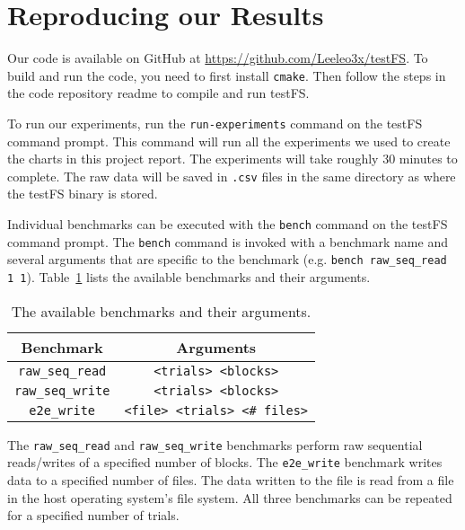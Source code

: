 \section{Reproducing our Results}
Our code is available on GitHub at \url{https://github.com/Leeleo3x/testFS}.
To build and run the code, you need to first install {\tt cmake}. Then
follow the steps in the code repository readme to compile and run testFS.

To run our experiments, run the {\tt run-experiments} command on the testFS
command prompt. This command will run all the experiments we used to create the
charts in this project report. The experiments will take roughly 30 minutes to
complete. The raw data will be saved in {\tt .csv} files in the same directory
as where the testFS binary is stored.

Individual benchmarks can be executed with the {\tt bench} command on the
testFS command prompt. The {\tt bench} command is invoked with a benchmark name
and several arguments that are specific to the benchmark (e.g. {\tt bench
  raw\_seq\_read 1 1}). Table~\ref{tbl:bench-commands} lists the available
benchmarks and their arguments.

\begin{table}[h!]
  \centering
  \caption{The available benchmarks and their arguments.}
  \label{tbl:bench-commands}
  \begin{tabular}{c|c}
    {\bf Benchmark} & {\bf Arguments} \\ \hline
    {\tt raw\_seq\_read} & {\tt <trials> <blocks>} \\ \hline
    {\tt raw\_seq\_write} & {\tt <trials> <blocks>} \\ \hline
    {\tt e2e\_write} & {\tt <file> <trials> <\# files>}
  \end{tabular}
\end{table}

The {\tt raw\_seq\_read} and {\tt raw\_seq\_write} benchmarks perform raw
sequential reads/writes of a specified number of blocks. The {\tt e2e\_write}
benchmark writes data to a specified number of files. The data written to the
file is read from a file in the host operating system's file system. All three
benchmarks can be repeated for a specified number of trials.
